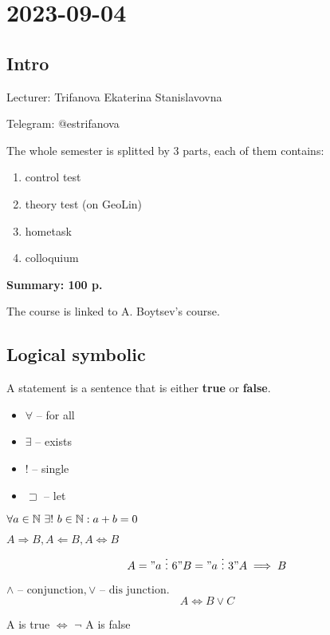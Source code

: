\section{2023-09-04}
\subsection{Intro}
Lecturer: Trifanova Ekaterina Stanislavovna

Telegram: @estrifanova

The whole semester is splitted by 3 parts, each of them contains: 
\begin{enumerate}
	\item control test 
	\item theory test (on GeoLin) 
	\item hometask
	\item colloquium 
\end{enumerate}

\textbf{Summary: 100 p.}

The course is linked to A. Boytsev's course.

\subsection{Logical symbolic}

\begin{definition}[]
	A statement is a sentence that is either \textbf{true} or \textbf{false}.
\end{definition}
 
\begin{itemize}
	\item $\forall$ -- for all 
	\item $\exists$ -- exists 
	\item ! -- single
	\item $\sqsupset$ -- let
\end{itemize}

\begin{example}[]
	$\forall a \in \mathbb{N} \ \exists ! \ b \in \mathbb{N}: a + b = 0 $
\end{example}

$A \Rightarrow B, A \Leftarrow B, A \Leftrightarrow B$
\[
	A = "a \ \vdots \ 6" \\
	B = "a \ \vdots \ 3" \\
	A \implies B
\]

$\wedge \text{ -- conjunction}, \vee \text{ -- dis junction}$. 
\[
	A \iff B \vee C
\]

\begin{lemma}
	A is true $\iff$ $\neg$ A is false
\end{lemma}

